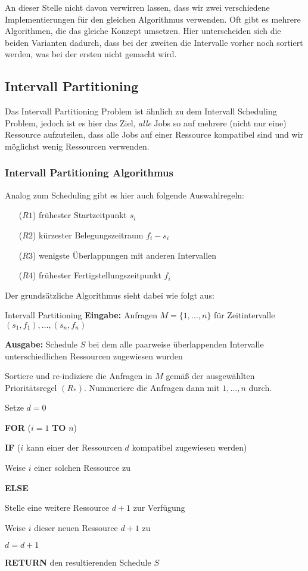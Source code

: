 \documentclass{panikzettel}
\newcommand\tab[1][1cm]{\hspace*{#1}}
\begin{document}
An dieser Stelle nicht davon verwirren lassen, dass wir zwei verschiedene Implementierungen für den gleichen Algorithmus verwenden. Oft gibt es mehrere Algorithmen, die das gleiche Konzept umsetzen. Hier unterscheiden sich die beiden Varianten dadurch, dass bei der zweiten die Intervalle vorher noch sortiert werden, was bei der ersten nicht gemacht wird. 

 
\subsection{Intervall Partitioning}

Das Intervall Partitioning Problem ist ähnlich zu dem Intervall Scheduling Problem, jedoch ist es hier das Ziel, \textit{alle} Jobs so auf mehrere (nicht nur eine) Ressource aufzuteilen, dass alle Jobs auf einer Ressource kompatibel sind und wir möglichst wenig Ressourcen verwenden. 

\subsubsection{Intervall Partitioning Algorithmus}

Analog zum Scheduling gibt es hier auch folgende Auswahlregeln:

\begin{itemize}
	\item[($R1$)] frühester Startzeitpunkt $s_i$
	\item[($R2$)] kürzester Belegungszeitraum $f_i - s_i$
	\item[($R3$)] wenigste Überlappungen mit anderen Intervallen
	\item[($R4$)] frühester Fertigstellungszeitpunkt $f_i$
\end{itemize}

Der grundsätzliche Algorithmus sieht dabei wie folgt aus:

\begin{algo}{Intervall Partitioning}
	\textbf{Eingabe:} Anfragen $M= \{1, \dots , n\}$ für Zeitintervalle $(s_1,f_1), \dots,(s_n,f_n)$
	
	\textbf{Ausgabe:} Schedule $S$ bei dem alle paarweise überlappenden Intervalle unterschiedlichen Ressourcen zugewiesen wurden
	\tcblower
	
	Sortiere und re-indiziere die Anfragen in $M$ gemäß der ausgewählten Prioritätsregel $(R_*)$. Nummeriere die Anfragen dann mit $1,\dots, n$ durch.
	
	Setze $d=0$
	
	\textbf{FOR} ($i = 1$ \textbf{TO} $n$)
	
	\tab \textbf{IF} ($i$ kann einer der Ressourcen $d$ kompatibel zugewiesen werden)
	
	\tab\tab Weise $i$ einer solchen Ressource zu
	
	\tab \textbf{ELSE}
	
	\tab\tab Stelle eine weitere Ressource $d+1$ zur Verfügung
	
	\tab\tab Weise $i$ dieser neuen Ressource $d+1$ zu
	
	\tab\tab $d= d+1$

	
	\textbf{RETURN} den resultierenden Schedule $S$
\end{algo}
\end{document}
